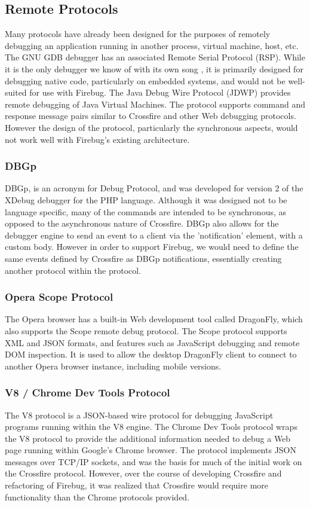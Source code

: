 \subsection{Remote Protocols}
Many protocols have already been designed for the purposes of remotely debugging
an application running in another process, virtual machine, host, etc. The GNU
GDB debugger has an associated Remote Serial Protocol (RSP)\cite{gdb-rsp}. While
it is the only debugger we know of with its own song \cite{gdb-song}, it is
primarily designed for debugging native code, particularly on embedded
systems, and would not be well-suited for use with Firebug. The Java Debug Wire Protocol (JDWP)
\cite{jdwp} provides remote debugging of Java Virtual Machines. The protocol
supports command and response message pairs similar to Crossfire and other Web
debugging protocols. However the design of the protocol, particularly the
synchronous aspects, would not work well with Firebug's existing architecture.

\subsubsection{DBGp}
DBGp\cite{dbgp}, is an acronym for Debug Protocol, and was developed for version
2 of the XDebug debugger for the PHP language. Although it was designed not to
be language specific, many of the commands are intended to be synchronous, as
opposed to the asynchronous nature of Crossfire. DBGp also allows for the
debugger engine to send an event to a client via the 'notification' element,
with a custom body. However in order to support Firebug, we would need to define
the same events defined by Crossfire as DBGp notifications, essentially creating
another protocol within the protocol.

\subsubsection{Opera Scope Protocol}
The Opera browser has a built-in Web development tool called DragonFly, which
also supports the Scope remote debug protocol. The Scope
protocol\cite{opera-scope} supports XML and JSON formats, and features such as
JavaScript debugging and remote DOM inspection. It is used to allow the desktop
DragonFly client to connect to another Opera browser instance, including mobile
versions.

\subsubsection{V8 / Chrome Dev Tools Protocol}
The V8 protocol\cite{V8} is a JSON-based wire protocol for debugging JavaScript
programs running within the V8 engine. The Chrome Dev Tools
protocol\cite{chrome-dev-tools} wraps the V8 protocol to provide the additional
information needed to debug a Web page running within Google's Chrome browser.
The protocol implements JSON messages over TCP/IP sockets, and was the basis for
much of the initial work on the Crossfire protocol. However, over the course of
developing Crossfire and refactoring of Firebug, it was realized that Crossfire
would require more functionality than the Chrome protocols provided.


